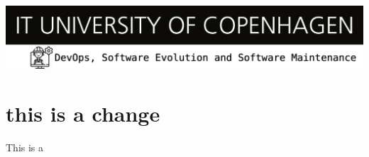 \documentclass{article}
\begin{document}
  \includegraphics[width=1\linewidth]{images/devops-banner.png}
  \section{this is a change}
  This is a 
  
\end{document}

